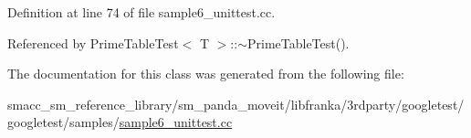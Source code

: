 Definition at line 74 of file sample6\+\_\+unittest.\+cc.



Referenced by Prime\+Table\+Test$<$ T $>$\+::$\sim$\+Prime\+Table\+Test().



The documentation for this class was generated from the following file\+:\begin{DoxyCompactItemize}
\item 
smacc\+\_\+sm\+\_\+reference\+\_\+library/sm\+\_\+panda\+\_\+moveit/libfranka/3rdparty/googletest/googletest/samples/\hyperlink{sample6__unittest_8cc}{sample6\+\_\+unittest.\+cc}\end{DoxyCompactItemize}
